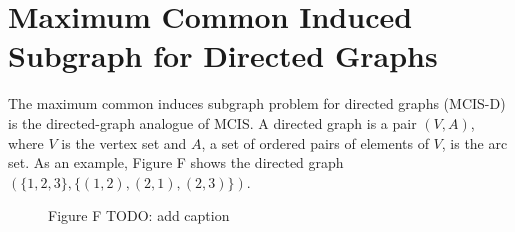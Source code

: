 
\section{Maximum Common Induced Subgraph for Directed Graphs}

The maximum common induces subgraph problem for directed graphs (MCIS-D) is the
directed-graph analogue of MCIS.  A directed graph is a pair $(V,A)$, where $V$ is
the vertex set and $A$, a set of ordered pairs of elements of $V$, is the arc set.
As an example, Figure F shows the directed graph $(\{1,2,3\}, \{(1,2), (2,1),
(2,3)\})$.

\begin{figure}[h!]
\centering
{}
\caption{Figure F TODO: add caption}
\end{figure}

